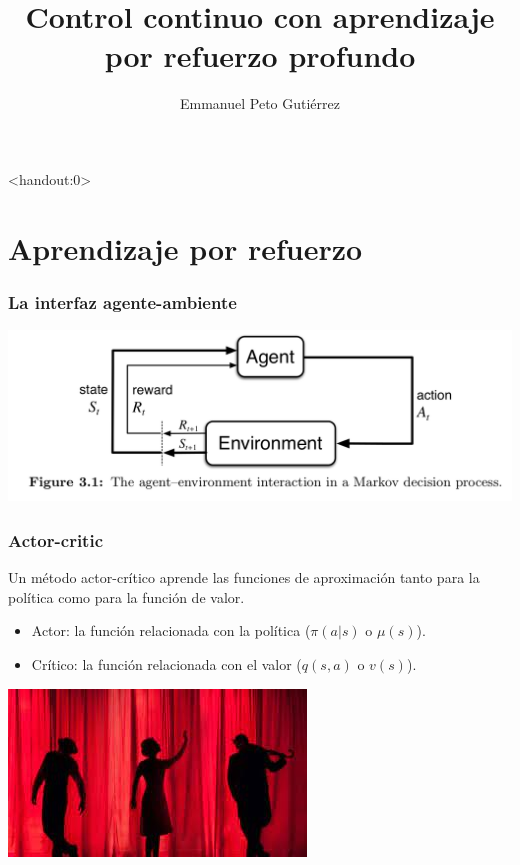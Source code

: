 \documentclass[
    11pt,
    aspectratio=169,
]{beamer}
\title{Control continuo con aprendizaje por refuerzo profundo}
\author{Emmanuel Peto Gutiérrez}
\institute{IIMAS \\ UNAM}
\begin{document}
\begin{frame}<handout:0>
\titlepage
\end{frame}

\section{Aprendizaje por refuerzo}

\begin{frame}
\frametitle{La interfaz agente-ambiente}

\begin{center}
\includegraphics[scale=0.26]{Images/env_agent}
\end{center}

\end{frame}

\begin{frame}
\frametitle{Actor-critic}

Un método actor-crítico aprende las funciones de aproximación tanto para la política como para la función de valor.

\begin{itemize}
\item Actor: la función relacionada con la política ($\pi (a|s)$ o $\mu (s)$).
\item Crítico: la función relacionada con el valor ($q(s,a)$ o $v(s)$).
\end{itemize}

\begin{center}
\includegraphics[scale=0.4]{Images/actores}
\end{center}

\end{frame}
\end{document}
